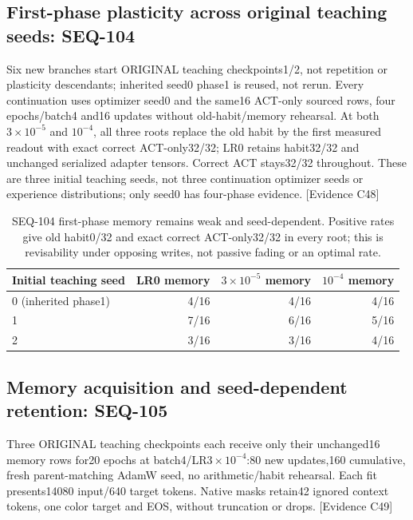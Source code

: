 \documentclass[11pt]{article}
\newcommand{\ev}[1]{\textsf{[Evidence #1]}}
\begin{document}
\subsection{First-phase plasticity across original teaching seeds: SEQ-104}
Six new branches start ORIGINAL teaching checkpoints1/2, not repetition or
plasticity descendants; inherited seed0 phase1 is reused, not rerun. Every
continuation uses optimizer seed0 and the same16 ACT-only sourced rows, four
epochs/batch4 and16 updates without old-habit/memory rehearsal. At both
$3\times10^{-5}$ and $10^{-4}$, all three roots replace the old habit by the
first measured readout with exact correct ACT-only32/32; LR0 retains habit32/32
and unchanged serialized adapter tensors. Correct ACT stays32/32 throughout.
These are three initial teaching seeds, not three continuation optimizer seeds
or experience distributions; only seed0 has four-phase evidence. \ev{C48}

\begin{table}[ht]
\centering\small
\begin{tabular}{lrrr}
\toprule
Initial teaching seed & LR0 memory & $3\times10^{-5}$ memory & $10^{-4}$ memory \\
\midrule
0 (inherited phase1) & 4/16 & 4/16 & 4/16 \\
1 & 7/16 & 6/16 & 5/16 \\
2 & 3/16 & 3/16 & 4/16 \\
\bottomrule
\end{tabular}
\caption{SEQ-104 first-phase memory remains weak and seed-dependent. Positive
rates give old habit0/32 and exact correct ACT-only32/32 in every root; this is
revisability under opposing writes, not passive fading or an optimal rate.}
\label{tab:seq104-plasticity}
\end{table}

\subsection{Memory acquisition and seed-dependent retention: SEQ-105}
Three ORIGINAL teaching checkpoints each receive only their unchanged16
memory rows for20 epochs at batch4/LR$3\times10^{-4}$:80 new updates,160
cumulative, fresh parent-matching AdamW seed, no arithmetic/habit rehearsal.
Each fit presents14080 input/640 target tokens. Native masks retain42 ignored
context tokens, one color target and EOS, without truncation or drops. \ev{C49}
\end{document}
